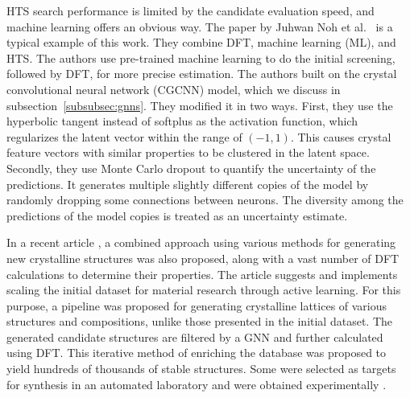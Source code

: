 HTS search performance is limited by the candidate evaluation speed, and machine learning offers an obvious way. The paper by Juhwan Noh et al.~\cite{nohUncertaintyQuantifiedHybridMachine2020} is a typical example of this work. They combine DFT, machine learning (ML), and HTS. The authors use pre-trained machine learning to do the initial screening, followed by DFT, for more precise estimation. The authors built on the crystal convolutional neural network (CGCNN) \cite{parkDevelopingImprovedCrystal2020} model, which we discuss in subsection~\ref{subsubsec:gnns}. They modified it in two ways. First, they use the hyperbolic tangent instead of softplus as the activation function, which regularizes the latent vector within the range of $(-1, 1)$. This causes crystal feature vectors with similar properties to be clustered in the latent space. Secondly, they use Monte Carlo dropout \cite{galDropoutBayesianApproximation2016} to quantify the uncertainty of the predictions. It generates multiple slightly different copies of the model by randomly dropping some connections between neurons. The diversity among the predictions of the model copies is treated as an uncertainty estimate.

In a recent article \cite{merchant2023scaling}, a combined approach using various methods for generating new crystalline structures was also proposed, along with a vast number of DFT calculations to determine their properties. The article suggests and implements scaling the initial dataset for material research through active learning. For this purpose, a pipeline was proposed for generating crystalline lattices of various structures and compositions, unlike those presented in the initial dataset. The generated candidate structures are filtered by a GNN and further calculated using DFT. This iterative method of enriching the database was proposed to yield hundreds of thousands of stable structures. Some were selected as targets for synthesis in an automated laboratory and were obtained experimentally \cite{szymanski2023autonomous}.


